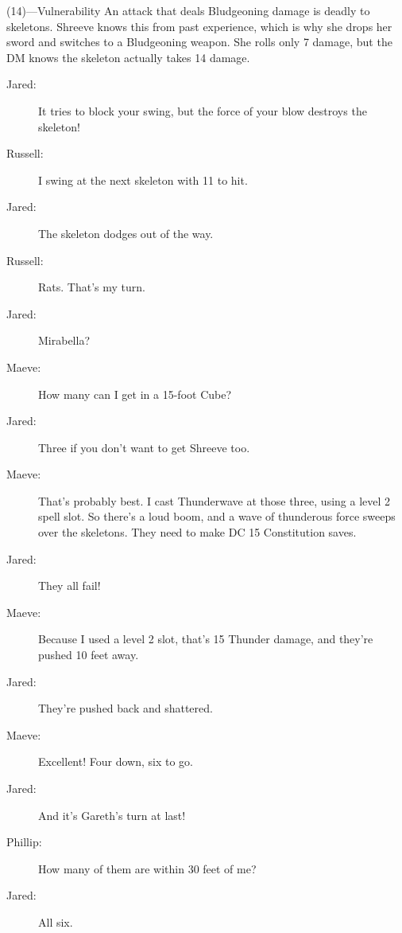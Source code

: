 \documentclass[10pt,a4paper,twoside,bg=print,twocolumn,openany,nodeprecatedcode]{dndbook}
\begin{document}
\begin{DndSidebar}[float=!b]{(14)—Vulnerability}
An attack that deals Bludgeoning damage is deadly to skeletons. Shreeve knows this from past experience, which is why she drops her sword and switches to a Bludgeoning weapon. She rolls only 7 damage, but the DM knows the skeleton actually takes 14 damage.



\end{DndSidebar}


\begin{description}
\item[Jared:]
It tries to block your swing, but the force of your blow destroys the skeleton!
\item[Russell:]
I swing at the next skeleton with 11 to hit.
\item[Jared:]
The skeleton dodges out of the way.
\item[Russell:]
Rats. That's my turn.
\item[Jared:]
Mirabella?
\end{description}

{\par \vspace { 9pt plus 3pt minus 3pt } \noindent  {} \nopagebreak }

\begin{description}
\item[Maeve:]
How many can I get in a 15-foot Cube?
\end{description}


\begin{description}
\item[Jared:]
Three if you don't want to get Shreeve too.
\end{description}

{\par \vspace { 9pt plus 3pt minus 3pt } \noindent  {} \nopagebreak }

\begin{description}
\item[Maeve:]
That's probably best. I cast Thunderwave at those three, using a level 2 spell slot. So there's a loud boom, and a wave of thunderous force sweeps over the skeletons. They need to make DC 15 Constitution saves.
\item[Jared:]
They all fail!
\end{description}


\begin{description}
\item[Maeve:]
Because I used a level 2 slot, that's 15 Thunder damage, and they're pushed 10 feet away.
\item[Jared:]
They're pushed back and shattered.
\item[Maeve:]
Excellent! Four down, six to go.
\item[Jared:]
And it's Gareth's turn at last!
\item[Phillip:]
How many of them are within 30 feet of me?
\item[Jared:]
All six.
\end{description}
\end{document}
